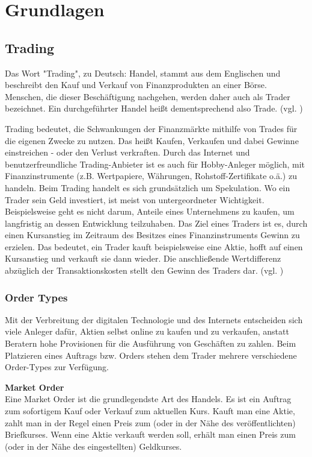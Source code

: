 \documentclass[oneside]{ausarbeitung}
\begin{document}
\chapter{Grundlagen}
\label{cha:grundlagen}

\section{Trading}
\label{sec:trading}

Das Wort "Trading", zu Deutsch: Handel, stammt aus dem Englischen und
beschreibt den Kauf und Verkauf von Finanzprodukten an einer Börse.
Menschen, die dieser Beschäftigung nachgehen, werden daher auch als
Trader bezeichnet. Ein durchgeführter Handel heißt dementsprechend
also Trade. (vgl. \cite{trading_1})

Trading bedeutet, die Schwankungen der Finanzmärkte mithilfe von
Trades für die eigenen Zwecke zu nutzen. Das heißt Kaufen, Verkaufen
und dabei Gewinne einstreichen - oder den Verlust verkraften. Durch
das Internet und benutzerfreundliche Trading-Anbieter ist es auch für
Hobby-Anleger möglich, mit Finanzinstrumente (z.B. Wertpapiere, Währungen,
Rohstoff-Zertifikate o.ä.) zu handeln. Beim Trading handelt
es sich grundsätzlich um Spekulation. Wo ein Trader sein Geld
investiert, ist meist von untergeordneter Wichtigkeit. Beispielsweise
geht es nicht darum, Anteile eines Unternehmens zu kaufen, um
langfristig an dessen Entwicklung teilzuhaben. Das Ziel eines Traders
ist es, durch einen Kursanstieg im Zeitraum des Besitzes eines
Finanzinstruments Gewinn zu erzielen. Das bedeutet, ein Trader kauft
beispielsweise eine Aktie, hofft auf einen Kursanstieg und verkauft
sie dann wieder. Die anschließende Wertdifferenz abzüglich der
Transaktionskosten stellt den Gewinn des Traders dar. (vgl.
\cite{trading_2})

\subsection{Order Types}
\label{sub:Order Types}

Mit der Verbreitung der digitalen Technologie und des Internets entscheiden sich viele Anleger dafür, Aktien selbst online zu kaufen und zu verkaufen, anstatt Beratern hohe Provisionen für die Ausführung von Geschäften zu zahlen. Beim Platzieren eines Auftrags bzw. Orders stehen dem Trader mehrere verschiedene Order-Types zur Verfügung.

\textbf{Market Order} \\
Eine Market Order ist die grundlegendste Art des Handels. Es ist ein Auftrag zum sofortigem Kauf oder Verkauf zum aktuellen Kurs. Kauft man eine Aktie, zahlt man in der Regel einen Preis zum (oder in der Nähe des veröffentlichten) Briefkurses. Wenn eine Aktie verkauft werden soll, erhält man einen Preis zum (oder in der Nähe des eingestellten) Geldkurses.
\end{document}
